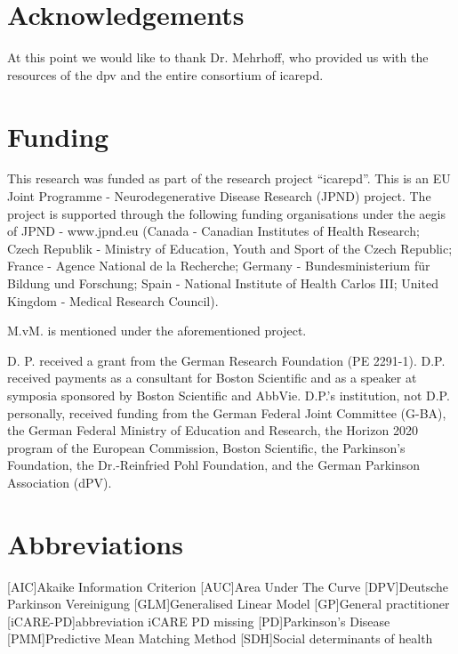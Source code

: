 \documentclass{bmcart}
\begin{document}

\begin{backmatter}

\section*{Acknowledgements}
At this point we would like to thank Dr. Mehrhoff, who provided us with the resources of the \ac{dpv} and the entire consortium of \ac{icarepd}.

\section*{Funding}%
This research was funded as part of the research project ``\ac{icarepd}''. This is an EU Joint Programme - Neurodegenerative Disease Research (JPND) project. The project is supported through the following funding organisations under the aegis of JPND - www.jpnd.eu (Canada - Canadian Institutes of Health Research; Czech Republik - Ministry of Education, Youth and Sport of the Czech Republic; France - Agence National de la Recherche; Germany - Bundesministerium für Bildung und Forschung; Spain - National Institute of Health Carlos III; United Kingdom - Medical Research Council). \newline

M.vM. is mentioned under the aforementioned project. \newline

D. P. received a grant from the German Research Foundation (PE 2291-1). D.P. received payments as a consultant for Boston Scientific and as a speaker at symposia sponsored by Boston Scientific and AbbVie. D.P.'s institution, not D.P. personally, received funding from the German Federal Joint Committee (G-BA), the German Federal Ministry of Education and Research, the Horizon 2020 program of the European Commission, Boston Scientific, the Parkinson’s Foundation, the Dr.-Reinfried Pohl Foundation, and the German Parkinson Association (dPV).

\section*{Abbreviations}
\begin{acronym}[ECU]
[AIC]{Akaike Information Criterion}
[AUC]{Area Under The Curve}
[DPV]{Deutsche Parkinson Vereinigung}
[GLM]{Generalised Linear Model}
[GP]{General practitioner}
[iCARE-PD]{abbreviation iCARE PD missing}
[PD]{Parkinson's Disease}
[PMM]{Predictive Mean Matching Method}
[SDH]{Social determinants of health}
\end{acronym}



\end{backmatter}
\end{document}
